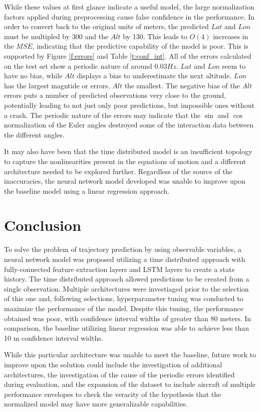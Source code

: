 \documentclass[10pt]{IEEEtran}
\begin{document}
While these values at first glance indicate a useful model, the large normalization factors applied during preprocessing cause false confidence in the performance. In order to convert back to the original units of meters, the predicted $Lat$ and $Lon$ must be multipled by 300 and the $Alt$ by 130. This leads to $O\left(4\right)$ increases in the $MSE$, indicating that the predictive capability of the model is poor. This is supported by Figure \ref{f:errors} and Table \ref{t:conf_int}. All of the errors calculated on the test set show a periodic nature of around $0.03 Hz$. $Lat$ and $Lon$ seem to have no bias, while $Alt$ displays a bias to underestimate the next altitude. $Lon$ has the largest magntide or errors, $Alt$ the smallest. The negative bias of the $Alt$ errors puts a number of predicted observations very close to the ground, potentially leading to not just only poor predictions, but impossible ones without a crash. The periodic nature of the errors may indicate that the $\sin$ and $\cos$ normalization of the Euler angles destroyed some of the interaction data between the different angles.

It may also have been that the time distributed model is an insufficient topology to capture the nonlinearities present in the equations of motion and a different architecture needed to be explored further. Regardless of the source of the inaccuracies, the neural network model developed was unable to improve upon the baseline model using a linear regression approach.

\section{Conclusion}
To solve the problem of trajectory prediction by using observable variables, a neural network model was proposed utilizing a time distributed approach with fully-connected feature extraction layers and LSTM layers to create a state history. The time distributed approach allowed predictions to be created from a single observation. Multiple architectures were investiaged prior to the selection of this one and, following selections, hyperparameter tuning was conducted to maximize the performance of the model. Despite this tuning, the performance obtained was poor, with confidence interval widths of greater than 80 meters. In comparison, the baseline utilizing linear regression was able to achieve less than 10 m confidence interval widths.

While this particular architecture was unable to meet the baseline, future work to improve upon the solution could include the investigation of additional architectures, the investigation of the cause of the periodic errors identified during evaluation, and the expansion of the dataset to include aircraft of multiple performance envelopes to check the veracity of the hypothesis that the normalized model may have more generalizable capabilities.



\end{document}
